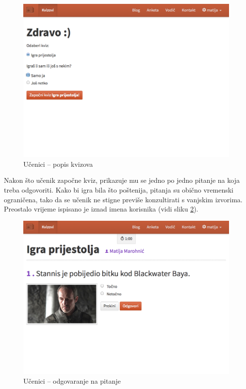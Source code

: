 \documentclass[11pt]{scrreprt}
\begin{document}
\begin{figure}[H]
  \includegraphics[width=\textwidth, clip=true, trim=0 8.5cm 0 0, fbox]{student/quizzes}
  \caption{Učenici -- popis kvizova}
  \label{student/quizzes}
\end{figure}

Nakon što učenik započne kviz, prikazuje mu se jedno po jedno pitanje na koja
treba odgovoriti. Kako bi igra bila što poštenija, pitanja su obično vremenski
ograničena, tako da se učenik ne stigne previše konzultirati s vanjskim
izvorima. Preostalo vrijeme ispisano je iznad imena korisnika (vidi sliku
\ref{question}).

\begin{figure}[H]
  \includegraphics[width=\textwidth, clip=true, trim=0 7cm 0 0, fbox]{student/boolean_question}
  \caption{Učenici -- odgovaranje na pitanje}
  \label{question}
\end{figure}
\end{document}
